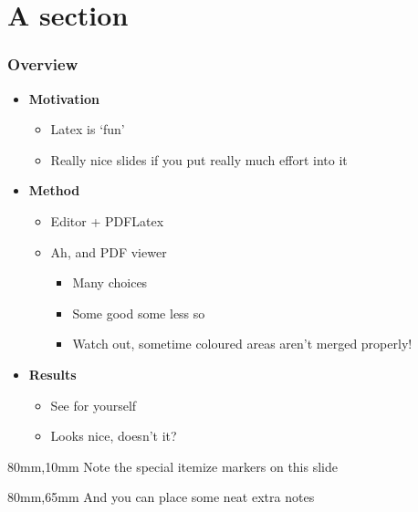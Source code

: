 \documentclass[mathserif, fleqn]{beamer}
\begin{document}
\begin{frame}
  \titlepage
\end{frame}

\section{A section}
\begin{frame}\frametitle{Overview}
  
  \begin{itemize}\setlength{\itemsep}{1.5ex}
  \item \textbf{Motivation}
    \begin{itemize}\setlength{\itemsep}{1ex}
    \item Latex is `fun'
    \item Really nice slides if you put really much effort into it
    \end{itemize}
  \item \textbf{Method}
    \begin{itemize}\setlength{\itemsep}{1ex}
    \item Editor + PDFLatex
    \item Ah, and PDF viewer
      \begin{itemize}
      \item Many choices
      \item Some good some less so
      \item Watch out, sometime coloured areas aren't merged properly!
      \end{itemize}
    \end{itemize}
  \item \textbf{Results}
    \begin{itemize}\setlength{\itemsep}{1ex}
    \item See for yourself
    \item Looks nice, doesn't it?
    \end{itemize}
  \end{itemize}

  \begin{aside}{40mm}{80mm,10mm}
    Note the special itemize markers on this slide
  \end{aside}

  \begin{aside}{30mm}{80mm,65mm}
    And you can place some neat extra notes
  \end{aside}
\end{frame}
\end{document}
